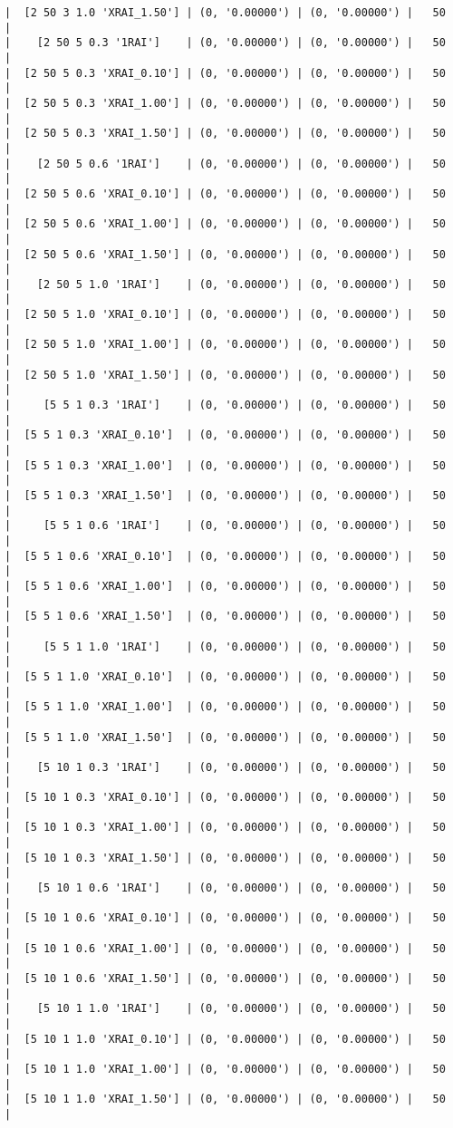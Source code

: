 \documentclass{article}
\begin{document}
\begin{verbatim}
|  [2 50 3 1.0 'XRAI_1.50'] | (0, '0.00000') | (0, '0.00000') |   50  |
|    [2 50 5 0.3 '1RAI']    | (0, '0.00000') | (0, '0.00000') |   50  |
|  [2 50 5 0.3 'XRAI_0.10'] | (0, '0.00000') | (0, '0.00000') |   50  |
|  [2 50 5 0.3 'XRAI_1.00'] | (0, '0.00000') | (0, '0.00000') |   50  |
|  [2 50 5 0.3 'XRAI_1.50'] | (0, '0.00000') | (0, '0.00000') |   50  |
|    [2 50 5 0.6 '1RAI']    | (0, '0.00000') | (0, '0.00000') |   50  |
|  [2 50 5 0.6 'XRAI_0.10'] | (0, '0.00000') | (0, '0.00000') |   50  |
|  [2 50 5 0.6 'XRAI_1.00'] | (0, '0.00000') | (0, '0.00000') |   50  |
|  [2 50 5 0.6 'XRAI_1.50'] | (0, '0.00000') | (0, '0.00000') |   50  |
|    [2 50 5 1.0 '1RAI']    | (0, '0.00000') | (0, '0.00000') |   50  |
|  [2 50 5 1.0 'XRAI_0.10'] | (0, '0.00000') | (0, '0.00000') |   50  |
|  [2 50 5 1.0 'XRAI_1.00'] | (0, '0.00000') | (0, '0.00000') |   50  |
|  [2 50 5 1.0 'XRAI_1.50'] | (0, '0.00000') | (0, '0.00000') |   50  |
|     [5 5 1 0.3 '1RAI']    | (0, '0.00000') | (0, '0.00000') |   50  |
|  [5 5 1 0.3 'XRAI_0.10']  | (0, '0.00000') | (0, '0.00000') |   50  |
|  [5 5 1 0.3 'XRAI_1.00']  | (0, '0.00000') | (0, '0.00000') |   50  |
|  [5 5 1 0.3 'XRAI_1.50']  | (0, '0.00000') | (0, '0.00000') |   50  |
|     [5 5 1 0.6 '1RAI']    | (0, '0.00000') | (0, '0.00000') |   50  |
|  [5 5 1 0.6 'XRAI_0.10']  | (0, '0.00000') | (0, '0.00000') |   50  |
|  [5 5 1 0.6 'XRAI_1.00']  | (0, '0.00000') | (0, '0.00000') |   50  |
|  [5 5 1 0.6 'XRAI_1.50']  | (0, '0.00000') | (0, '0.00000') |   50  |
|     [5 5 1 1.0 '1RAI']    | (0, '0.00000') | (0, '0.00000') |   50  |
|  [5 5 1 1.0 'XRAI_0.10']  | (0, '0.00000') | (0, '0.00000') |   50  |
|  [5 5 1 1.0 'XRAI_1.00']  | (0, '0.00000') | (0, '0.00000') |   50  |
|  [5 5 1 1.0 'XRAI_1.50']  | (0, '0.00000') | (0, '0.00000') |   50  |
|    [5 10 1 0.3 '1RAI']    | (0, '0.00000') | (0, '0.00000') |   50  |
|  [5 10 1 0.3 'XRAI_0.10'] | (0, '0.00000') | (0, '0.00000') |   50  |
|  [5 10 1 0.3 'XRAI_1.00'] | (0, '0.00000') | (0, '0.00000') |   50  |
|  [5 10 1 0.3 'XRAI_1.50'] | (0, '0.00000') | (0, '0.00000') |   50  |
|    [5 10 1 0.6 '1RAI']    | (0, '0.00000') | (0, '0.00000') |   50  |
|  [5 10 1 0.6 'XRAI_0.10'] | (0, '0.00000') | (0, '0.00000') |   50  |
|  [5 10 1 0.6 'XRAI_1.00'] | (0, '0.00000') | (0, '0.00000') |   50  |
|  [5 10 1 0.6 'XRAI_1.50'] | (0, '0.00000') | (0, '0.00000') |   50  |
|    [5 10 1 1.0 '1RAI']    | (0, '0.00000') | (0, '0.00000') |   50  |
|  [5 10 1 1.0 'XRAI_0.10'] | (0, '0.00000') | (0, '0.00000') |   50  |
|  [5 10 1 1.0 'XRAI_1.00'] | (0, '0.00000') | (0, '0.00000') |   50  |
|  [5 10 1 1.0 'XRAI_1.50'] | (0, '0.00000') | (0, '0.00000') |   50  |

\end{verbatim}
\end{document}
